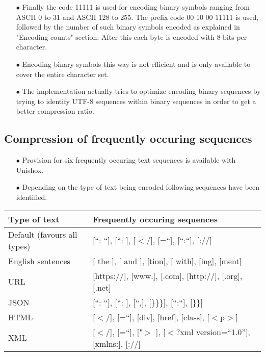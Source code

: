 \documentclass[]{article}
\begin{document}
\begin{itemize}
		\item[$\bullet$] Finally the code 11111 is used for encoding binary symbols ranging from ASCII 0 to 31 and ASCII 128 to 255. The prefix code 00 10 00 11111 is used, followed by the number of such binary symbols encoded as explained in "Encoding counts" section. After this each byte is encoded with 8 bits per character.
		\item[$\bullet$] Encoding binary symbols this way is not efficient and is only available to cover the entire character set.
		\item[$\bullet$] The implementation actually tries to optimize encoding binary sequences by trying to identify UTF-8 sequences within binary sequences in order to get a better compression ratio. 
	\end{itemize}
	
	\subsection{Compression of frequently occuring sequences}
	\begin{itemize}
		\item[$\bullet$] Provision for six frequently occuring text sequences is available with Unishox.
		\item[$\bullet$] Depending on the type of text being encoded following sequences have been identified.
	\end{itemize}
	\begin{tabular}{ | l | l |} \hline
		﻿\textbf{Type of text} & ﻿\textbf{Frequently occuring sequences} \\ \hline
		Default (favours all types) & [\textquotedblleft: \textquotedblleft], [\textquotedblleft: ], [$<$/], [=\textquotedblleft], [\textquotedblleft:\textquotedblleft], [://] \\ \hline
		English sentences & [ the ], [ and ], [tion], [ with], [ing], [ment] \\ \hline
		URL & [https://], [www.], [.com], [http://], [.org], [.net] \\ \hline
		JSON & [\textquotedblleft: \textquotedblleft], [\textquotedblleft: ], [\textquotedblleft,], [\}\}\}], [\textquotedblleft:\textquotedblleft], [\}\}] \\ \hline
		HTML & [$<$/], [=\textquotedblleft], [div], [href], [class], [$<$p$>$] \\ \hline
		XML & [$<$/], [=\textquotedblleft], ["$>$ ], [$<$?xml version=\textquotedblleft1.0\textquotedblright], [xmlns:], [://] \\ \hline
	\end{tabular}
	
\end{document}
